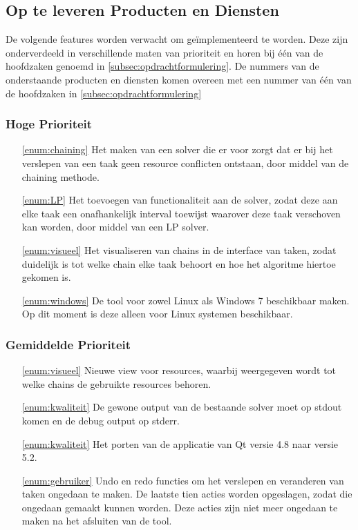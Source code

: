\subsection{Op te leveren Producten en Diensten}
\label{subsec:producten}
De volgende features worden verwacht om ge\"implementeerd te worden. Deze zijn onderverdeeld in verschillende maten van prioriteit en horen bij \'e\'en van de hoofdzaken genoemd in \ref{subsec:opdrachtformulering}. De nummers van de onderstaande producten en diensten komen overeen met een nummer van \'e\'en van de hoofdzaken in \ref{subsec:opdrachtformulering}

\subsubsection*{Hoge Prioriteit}
\begin{itemize}
	\item[\ref{enum:chaining}] Het maken van een solver die er voor zorgt dat er bij het verslepen van een taak geen resource conflicten ontstaan, door middel van de chaining methode.
	\item[\ref{enum:LP}] Het toevoegen van functionaliteit aan de solver, zodat deze aan elke taak een onafhankelijk interval toewijst waarover deze taak verschoven kan worden, door middel van een LP solver.
	\item[\ref{enum:visueel}] Het visualiseren van chains in de interface van taken, zodat duidelijk is tot welke chain elke taak behoort en hoe het algoritme hiertoe gekomen is.
	\item[\ref{enum:windows}] De tool voor zowel Linux als Windows 7 beschikbaar maken. Op dit moment is deze alleen voor Linux systemen beschikbaar.
\end{itemize}

\subsubsection*{Gemiddelde Prioriteit}
\begin{itemize}
	\item[\ref{enum:visueel}] Nieuwe view voor resources, waarbij weergegeven wordt tot welke chains de gebruikte resources behoren.
	\item[\ref{enum:kwaliteit}] De gewone output van de bestaande solver moet op stdout komen en de debug output op stderr.
	\item[\ref{enum:kwaliteit}] Het porten van de applicatie van Qt versie 4.8 naar versie 5.2.
	\item[\ref{enum:gebruiker}] Undo en redo functies om het verslepen en veranderen van taken ongedaan te maken. De laatste tien acties worden opgeslagen, zodat die ongedaan gemaakt kunnen worden. Deze acties zijn niet meer ongedaan te maken na het afsluiten van de tool.
\end{itemize}

